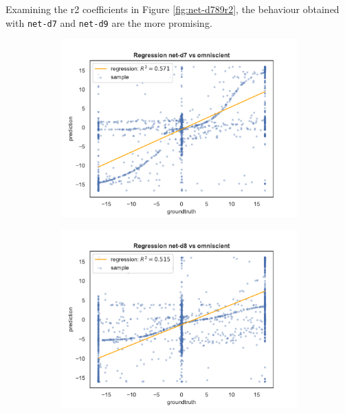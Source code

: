 Examining the \gls{r2} coefficients in Figure \ref{fig:net-d789r2}, the behaviour 
obtained with \texttt{net-d7} and \texttt{net-d9} are the more promising. 
\begin{figure}[!htb]
	\begin{center}
		\begin{subfigure}[h]{0.49\textwidth}
 			\includegraphics[width=\textwidth]{contents/images/net-d7/regression-net-d7-vs-omniscient}%
		\end{subfigure}
		\hfill
		\begin{subfigure}[h]{0.49\textwidth}
			\includegraphics[width=\textwidth]{contents/images/net-d8/regression-net-d8-vs-omniscient}%
		\end{subfigure}

\end{center}
\end{figure}
